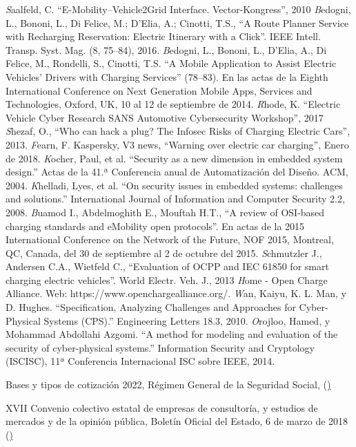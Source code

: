 \documentclass[12pt,a4paper,onecolumn,oneside]{report}
\begin{document}
\begin{thebibliography}{1}
 \textit Saalfeld, C. ``E-Mobility–Vehicle2Grid Interface. Vector-Kongress”, 2010
 \textit Bedogni, L., Bononi, L., Di Felice, M.; D’Elia, A.; Cinotti, T.S., ``A Route Planner Service with Recharging
Reservation: Electric Itinerary with a Click”. IEEE Intell. Transp. Syst. Mag. (8, 75–84), 2016.
 \textit Bedogni, L., Bononi, L., D’Elia, A., Di Felice, M., Rondelli, S., Cinotti, T.S. ``A Mobile Application to Assist
Electric Vehicles’ Drivers with Charging Services” (78–83). En las actas de la Eighth International Conference on Next Generation Mobile Apps, Services and Technologies, Oxford, UK, 10 al 12 de septiembre de 2014.
 \textit Rhode, K. ``Electric Vehicle Cyber Research SANS Automotive Cybersecurity Workshop”, 2017
 \textit Shezaf, O., ``Who can hack a plug? The Infosec Risks of Charging Electric Cars”, 2013.
 \textit Fearn, F. Kaspersky, V3 news, ``Warning over electric car charging”, Enero de 2018.
 \textit Kocher, Paul, et al. ``Security as a new dimension in embedded system design.” Actas de la 41.ª Conferencia anual de Automatización del Diseño. ACM, 2004.
 \textit Khelladi, Lyes, et al. ``On security issues in embedded systems: challenges and solutions.” International Journal of Information and Computer Security 2.2, 2008.
 \textit Buamod I., Abdelmoghith E.,  Mouftah H.T., ``A review of OSI-based charging standards and eMobility open protocols”. En actas de la 2015 International Conference on the Network of the Future, NOF 2015, Montreal, QC, Canada, del 30 de septiembre al 2 de octubre del 2015.
 \textit Schmutzler J., Andersen C.A., Wietfeld C., ``Evaluation of OCPP and IEC 61850 for smart charging electric
vehicles”. World Electr. Veh. J., 2013
 \textit Home - Open Charge Alliance. Web: https://www.openchargealliance.org/.
 \textit Wan, Kaiyu, K. L. Man, y D. Hughes. ``Specification, Analyzing Challenges and Approaches for Cyber-Physical Systems (CPS).” Engineering Letters 18.3, 2010.
 \textit Orojloo, Hamed, y Mohammad Abdollahi Azgomi. ``A method for modeling and evaluation of the security of cyber-physical systems.” Information Security and Cryptology (ISCISC), 11ª Conferencia Internacional ISC sobre IEEE, 2014.
 \item Bases y tipos de cotización 2022, Régimen General de la Seguridad Social, (\href{https://www.seg-social.es/wps/portal/wss/internet/Trabajadores/CotizacionRecaudacionTrabajadores/36537})
 \item XVII Convenio colectivo estatal de empresas de consultoría, y estudios de
mercados y de la opinión pública, Boletín Oficial del Estado, 6 de marzo de 2018 (\href{https://www.boe.es/boe/dias/2018/03/06/pdfs/BOE-A-2018-3156.pdf})


\end{thebibliography}
\end{document}
